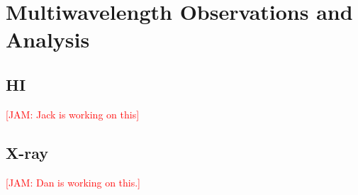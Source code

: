 \documentclass[iop]{emulateapj}
\newcommand{\kibitz}[2]{\ifnum\Comments=1\textcolor{#1}{#2}\fi}
\newcommand{\jamie}[1]{\kibitz{red}      {[JAM: #1]}}
\begin{document}
%
%

\section{Multiwavelength  Observations and  Analysis }\label{sec:Multiwave}
\subsection{HI}\label{sec:HI}
\jamie{Jack is working on this}
\subsection{X-ray}\label{sec:Xray}
\jamie{Dan is working on this.}



%
%
\end{document}
